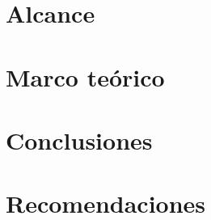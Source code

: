 \documentclass[11pt, letterpaper, twoside, openright]{report}
\newcommand{\defaultparformat}[1]{
	{\setlength{\parskip}{2ex}
     }
}
\begin{document}
\ifdefined\CAPalcance
	\newpage
	\chapter{Alcance}
	\ifdefined\parpordefecto
    	\defaultparformat{h-alcance}
    \else
    	
    \fi 
\fi

\ifdefined\CAPmarcoteorico
	\newpage
	\chapter{Marco teórico}
	\ifdefined\parpordefecto
		\defaultparformat{i-marco_teorico}
	\else
		
	\fi
\fi

\newpage
\ifdefined\parpordefecto
	\defaultparformat{j-capitulos}
\else
	
\fi

\newpage


\newpage


\ifdefined\CAPconclusiones
	\newpage
	\chapter{Conclusiones}
	\ifdefined\parpordefecto
		\defaultparformat{k-conclusiones}
	\else
		
	\fi
\fi

\ifdefined\CAPrecomendaciones
	\newpage
	\chapter{Recomendaciones}\label{cap:recomendaciones}
	\ifdefined\parpordefecto
		\defaultparformat{l-recomendaciones}
	\else
		
	\fi
\fi

\ifdefined\CAPbibliografia
	\newpage
    \cleardoublepage{}
\end{document}
